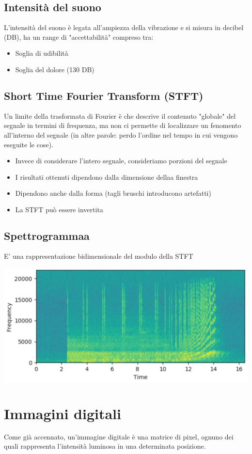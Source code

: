 \documentclass[12pt, a4paper]{report}
\begin{document}
\section{Intensità del suono}
L'intensità del suono è legata all'ampiezza della vibrazione e si misura in decibel (DB), ha un range di "accettabilità" compreso tra:
\begin{itemize}
    \item Soglia di udibilità
    \item Soglia del dolore (130 DB)
\end{itemize}
\section{Short Time Fourier Transform (STFT)}
Un limite della trasformata di Fourier è che descrive il contenuto "globale" del segnale in termini di frequenza, ma non ci permette di localizzare un fenomento all'interno del segnale (in altre parole: perdo l'ordine nel tempo in cui vengono eseguite le cose).
\begin{itemize}
    \item Invece di considerare l'intero segnale, consideriamo porzioni del segnale
    \item I risultati ottenuti dipendono dalla dimensione dellaa finestra
    \item Dipendono anche dalla forma (tagli bruschi introducono artefatti)
    \item La STFT può essere invertita
\end{itemize}
\section{Spettrogrammaa}
E' una rappresentazione bidimensionale del modulo della STFT
\begin{center}
    \includegraphics[width=.8\textwidth]{Immagini/spettrogramma.png}
\end{center}
\chapter{Immagini digitali}
Come già accennato, un'immagine digitale è una matrice di pixel, ognuno dei quali rappresenta l'intensità luminosa in una determinata posizione.
\end{document}
